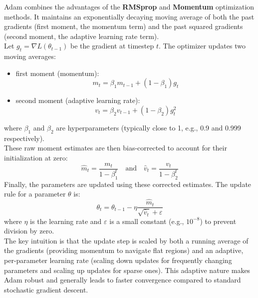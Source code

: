Adam combines the advantages of the \textbf{RMSprop} and \textbf{Momentum} optimization methods. It maintains an exponentially decaying moving average of both the past gradients (first moment, the momentum term) and the past squared gradients (second moment, the adaptive learning rate term).\\

Let $g_t=\nabla L(\theta_{t-1})$ be the gradient at timestep $t$. The optimizer updates two moving averages:
\begin{itemize}
    \item[-] first moment (momentum):
    \begin{equation}
        m_t=\beta_1m_{t-1}+(1-\beta_1)g_t
    \end{equation}
    \item[-] second moment (adaptive learning rate):
    \begin{equation}
        v_t=\beta_2v_{t-1}+(1-\beta_2)g_t^2
    \end{equation}
\end{itemize}
where $\beta_1$ and $\beta_2$ are hyperparameters (typically close to 1, e.g., 0.9 and 0.999 respectively).\\

These raw moment estimates are then bias-corrected to account for their initialization at zero:
\begin{equation}
    \hat m_t=\frac{m_t}{1-\beta_1^t}\quad\text{and}\quad \hat v_t=\frac{v_t}{1-\beta_2^t}
\end{equation}
\vspace{2ex}
Finally, the parameters are updated using these corrected estimates. The update rule for a parameter $\theta$ is:
\begin{equation}
    \theta_t=\theta_{t-1}-\eta \frac{\hat m_t}{\sqrt{\hat v_t}+\varepsilon}
\end{equation}
where $\eta$ is the learning rate and $\varepsilon$ is a small constant (e.g., $10^{-8}$) to prevent division by zero.\\

The key intuition is that the update step is scaled by both a running average of the gradients (providing momentum to navigate flat regions) and an adaptive, per-parameter learning rate (scaling down updates for frequently changing parameters and scaling up updates for sparse ones). This adaptive nature makes Adam robust and generally leads to faster convergence compared to standard stochastic gradient descent.


